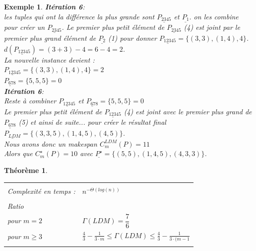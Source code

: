 \documentclass[a4paper,12pt]{report}
\theoremstyle{plain}				%
\newtheorem{theoreme}{Théorème}	%
\newtheorem{example}{Exemple}
\theoremstyle{definition}				%
\begin{document}
\begin{itemize}
\begin{example}
\textbf{Itération 6}:\\
les tuples qui ont la différence la plus grande sont
$\underline{P_{2345}}$  et $\underline{P_{1}}$.
on les combine pour créer un $\underline{P_{2345}}$. Le premier plus petit élément de $\underline{P_{2345}}$ (4) est joint par le premier plus grand élément de $\underline{P_{2}}$ (1) pour donner  $\underline{P_{12345}} = \{(3,3),(1,4),4\}$.
$d(\underline{P_{12345}}) = (3+3)-4 = 6-4=2$.\\
La nouvelle instance devient :\\
$\underline{P_{12345}} = \{(3,3),(1,4),4\}=2$\\
$\underline{P_{678}} = \{5,5,5\}=0$\\

\textbf{Itération 6}:\\
Reste à combiner $\underline{P_{12345}}$ et $\underline{P_{678}} = \{5,5,5\}=0$\\
Le premier plus petit élément de $\underline{P_{12345}}$ (4) est joint avec le premier plus grand de  $\underline{P_{678}}$ (5) et ainsi de suite... pour créer le résultat final \\
$\underline{P_{LDM}}= \{(3,3,5),(1,4,5),(4,5)\}$.\\

Nous avons donc un makespan $C_m^{LDM}(P) = 11 $ \\
Alors que $C_m^{\star}(P) = 10$ avec $\underline{P^{\star}}= \{(5,5),(1,4,5),(4,3,3)\}$.
\end{example}

\end{itemize}



\begin{theoreme}
\begin{flushleft}
\begin{tabular}{|p{8cm}p{6cm}|}
\hline
& \\
Complexité en temps \cite{michiels2003performance} :& $n^{- \Theta (log(n))}$
\\	%
& \\
Ratio \cite{michiels2003performance} &\\
pour $m=2$						& $\Gamma(LDM) = \dfrac{7}{6}$\\
pour $m\geq 3$					& $ \frac{4}{3}-\frac{1}{3 \cdot m} \leq
   									\Gamma(LDM) 						\leq
   									\frac{4}{3}-\frac{1}{3 \cdot (m-1}$
\\
& \\
\hline
\end{tabular}
\end{flushleft}

\end{theoreme}
\end{document}
